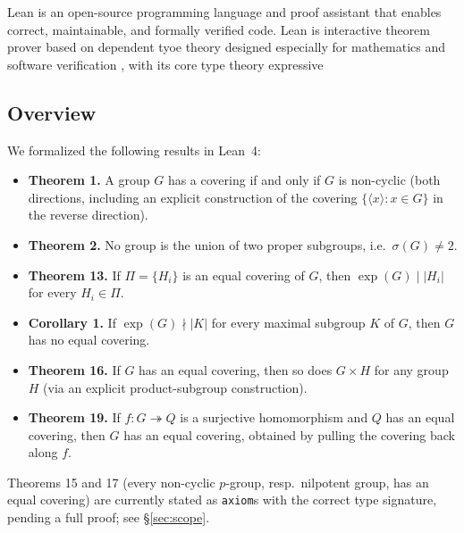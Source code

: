 \documentclass[12pt, a4paper]{article}
\theoremstyle{plain}
\theoremstyle{definition}
\begin{document}
Lean is an open-source programming language and proof assistant that enables correct, maintainable, and formally verified code.
Lean is interactive theorem prover based on dependent tyoe theory designed especially for mathematics and software verification , with its core type theory expressive

\cite{lean}

\subsection{Overview}
We formalized the following results in Lean~4:
\begin{itemize}
  \item \textbf{Theorem 1.} A group $G$ has a covering if and only if $G$
    is non-cyclic (both directions, including an explicit construction of
    the covering $\{\langle x \rangle : x \in G\}$ in the reverse direction).
  \item \textbf{Theorem 2.} No group is the union of two proper subgroups,
    i.e.\ $\sigma(G) \neq 2$.
  \item \textbf{Theorem 13.} If $\Pi = \{H_i\}$ is an equal covering of $G$,
    then $\exp(G) \mid |H_i|$ for every $H_i \in \Pi$.
  \item \textbf{Corollary 1.} If $\exp(G) \nmid |K|$ for every maximal
    subgroup $K$ of $G$, then $G$ has no equal covering.
  \item \textbf{Theorem 16.} If $G$ has an equal covering, then so does
    $G \times H$ for any group $H$ (via an explicit product-subgroup
    construction).
  \item \textbf{Theorem 19.} If $f : G \twoheadrightarrow Q$ is a surjective
    homomorphism and $Q$ has an equal covering, then $G$ has an equal
    covering, obtained by pulling the covering back along $f$.
\end{itemize}
Theorems 15 and 17 (every non-cyclic $p$-group, resp.\ nilpotent group, has
an equal covering) are currently stated as \texttt{axiom}s with the correct
type signature, pending a full proof; see \S\ref{sec:scope}.
\end{document}
